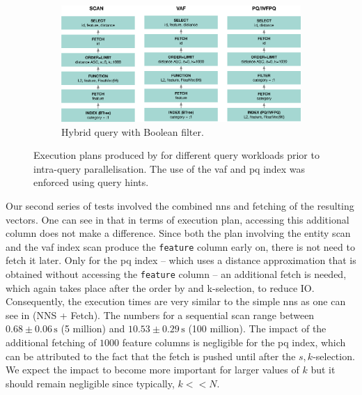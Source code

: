 \begin{figure}[p]
    \hfill
    \centering
    \begin{subfigure}[b]{\textwidth}
        \centering
        \includegraphics[width=\textwidth]{figures/bignns/cottontail/query-plan-hybrid}
        \caption{Hybrid query with Boolean filter.}
        \label{figure:cottontail_hybrid_plan}
    \end{subfigure}
    \caption{Execution plans produced by \cottontail{} for different query workloads prior to intra-query parallelisation. The use of the \acrshort{vaf} and \acrshort{pq} index was enforced using query hints.}
    \label{figure:cottontail_plans}
\end{figure}

Our second series of tests involved the combined \acrshort{nns} and fetching of the resulting vectors. One can see in  that in terms of execution plan, accessing this additional column does not make a difference. Since both the plan involving the entity scan and the \acrshort{vaf} index scan produce the \texttt{feature} column early on, there is not need to fetch it later. Only for the \acrshort{pq} index -- which uses a distance approximation that is obtained without accessing the \texttt{feature} column -- an additional fetch is needed, which again takes place after the order by and k-selection, to reduce IO. Consequently, the execution times are very similar to the simple \acrshort{nns} as one can see in  (NNS + Fetch). The numbers for a sequential scan range between $0.68 \pm 0.06 \, \si{\second}$ (5 million) and $10.53 \pm 0.29 \, \si{\second}$ (100 million). The impact of the additional fetching of $1000$ feature columns is negligible for the \acrshort{pq} index, which can be attributed to the fact that the fetch is pushed until after the $s,k$-selection. We expect the impact to become more important for larger values of $k$ but it should remain negligible since typically, $k << N$.

